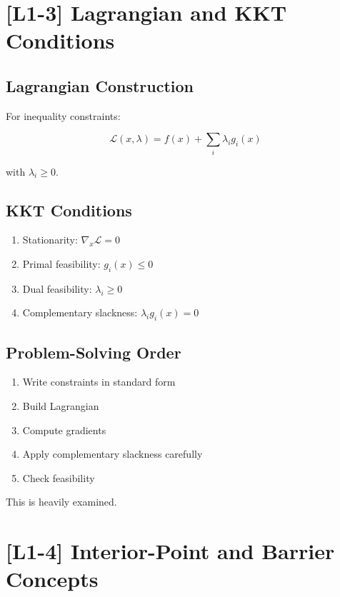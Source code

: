 \documentclass[11pt]{article}
\begin{document}
\newpage

\section*{[L1-3] Lagrangian and KKT Conditions}

\subsection*{Lagrangian Construction}

For inequality constraints:

\[
\mathcal{L}(x,\lambda) = f(x) + \sum_i \lambda_i g_i(x)
\]

with $\lambda_i \ge 0$.

\subsection*{KKT Conditions}

\begin{enumerate}
\item Stationarity: $\nabla_x \mathcal{L} = 0$
\item Primal feasibility: $g_i(x)\le0$
\item Dual feasibility: $\lambda_i \ge 0$
\item Complementary slackness: $\lambda_i g_i(x)=0$
\end{enumerate}

\subsection*{Problem-Solving Order}

\begin{enumerate}
\item Write constraints in standard form
\item Build Lagrangian
\item Compute gradients
\item Apply complementary slackness carefully
\item Check feasibility
\end{enumerate}

This is heavily examined.

\newpage

\section*{[L1-4] Interior-Point and Barrier Concepts}
\end{document}
